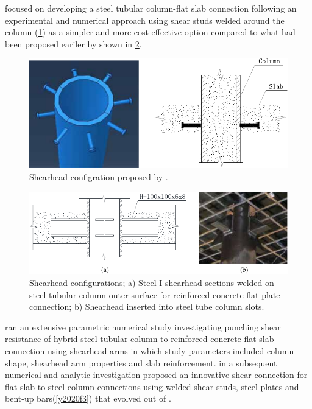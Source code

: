 \cite{yu2018} focused on developing a steel tubular column-flat slab connection following an experimental and numerical approach using shear studs welded around the column (\ref{yu2018f2}) as a simpler and more cost effective option compared to what had been proposed eariler by \cite{LEE2008418,yan2011,yan2014,yan2016} shown in \ref{yu2018f1}. 
\begin{figure}\centering
    \includegraphics[width=\columnwidth]{Figures/yu2018f2.pdf}
    \caption{Shearhead configration proposed by \cite{yu2018}.}
    \label{yu2018f2}
    \end{figure}
\begin{figure}\centering
    \includegraphics[width=\columnwidth]{Figures/yu2018f1.pdf}
    \caption{Shearhead configurations; a) Steel I shearhead sections welded on steel tubular column outer surface for reinforced concrete flat plate connection\citep{LEE2008418}; b) Shearhead inserted into steel tube column slots\citep{yan2016}.}
    \label{yu2018f1}
    \end{figure}
\cite{yan2016} ran an extensive parametric numerical study investigating punching shear resistance of hybrid steel tubular column to reinforced concrete flat slab connection using shearhead arms in which study parameters included column shape, shearhead arm properties and slab reinforcement. \citep{yu2020} in a  subsequent numerical and analytic investigation proposed an innovative shear connection for flat slab to steel column connections using welded shear studs, steel plates and bent-up bars(\ref{y2020f3}) that evolved out of \cite{yu2018}. 
